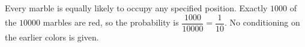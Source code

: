 Every marble is equally likely to occupy any specified position. Exactly $1000$ of the $10000$ marbles are red, so the probability is $\dfrac{1000}{10000}=\boxed{\dfrac{1}{10}}$. No conditioning on the earlier colors is given.
